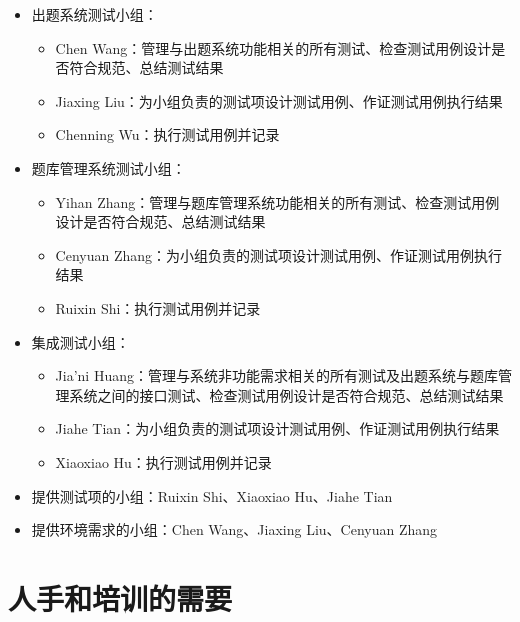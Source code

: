 \documentclass[hyperref, a4paper]{ctexart}
\providecommand{\tightlist}{%
  \setlength{\itemsep}{0pt}\setlength{\parskip}{0pt}}
\begin{document}
\begin{itemize}
\tightlist
\item
  出题系统测试小组：

  \begin{itemize}
  \tightlist
  \item
    Chen
    Wang：管理与出题系统功能相关的所有测试、检查测试用例设计是否符合规范、总结测试结果
  \item
    Jiaxing Liu：为小组负责的测试项设计测试用例、作证测试用例执行结果
  \item
    Chenning Wu：执行测试用例并记录
  \end{itemize}
\item
  题库管理系统测试小组：

  \begin{itemize}
  \tightlist
  \item
    Yihan
    Zhang：管理与题库管理系统功能相关的所有测试、检查测试用例设计是否符合规范、总结测试结果
  \item
    Cenyuan Zhang：为小组负责的测试项设计测试用例、作证测试用例执行结果
  \item
    Ruixin Shi：执行测试用例并记录
  \end{itemize}
\item
  集成测试小组：

  \begin{itemize}
  \tightlist
  \item
    Jia'ni
    Huang：管理与系统非功能需求相关的所有测试及出题系统与题库管理系统之间的接口测试、检查测试用例设计是否符合规范、总结测试结果
  \item
    Jiahe Tian：为小组负责的测试项设计测试用例、作证测试用例执行结果
  \item
    Xiaoxiao Hu：执行测试用例并记录
  \end{itemize}
\item
  提供测试项的小组：Ruixin Shi、Xiaoxiao Hu、Jiahe Tian
\item
  提供环境需求的小组：Chen Wang、Jiaxing Liu、Cenyuan Zhang
\end{itemize}

\hypertarget{ux4ebaux624bux548cux57f9ux8badux7684ux9700ux8981}{%
\section{人手和培训的需要}\label{ux4ebaux624bux548cux57f9ux8badux7684ux9700ux8981}}
\end{document}
